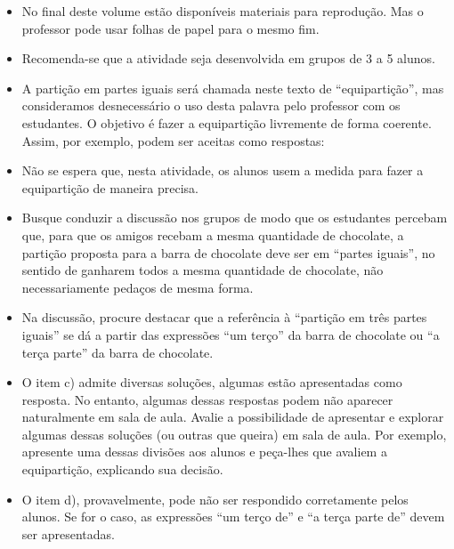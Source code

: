 \begin{multicols}{2}
\begin{orientacoes}
  \begin{itemize} %
  \item No final deste volume estão disponíveis materiais para reprodução. Mas o professor pode usar folhas de papel para o mesmo fim.
  \item Recomenda-se que a atividade seja desenvolvida em grupos de 3 a 5 alunos.
  \item A partição em partes iguais será chamada neste texto de ``equipartição'', mas consideramos desnecessário o uso desta palavra pelo professor com os estudantes. O objetivo é fazer a equipartição livremente de forma coerente. Assim, por exemplo, podem ser aceitas como respostas:
    \begin{center}
    \end{center}
  \item  Não se espera que, nesta atividade, os alunos usem a medida para fazer a equipartição de maneira precisa.
    \item Busque conduzir a discussão nos grupos de modo que os estudantes percebam que, para que os amigos recebam a mesma quantidade de chocolate, a partição proposta para a barra de chocolate deve ser em ``partes iguais'', no sentido de ganharem todos a mesma quantidade de chocolate, não necessariamente pedaços de mesma forma.
    \item Na discussão, procure destacar que a referência à ``partição em três partes iguais'' se dá a partir das expressões ``um terço'' da barra de chocolate ou ``a terça parte'' da barra de chocolate.
    \item O item c) admite diversas soluções, algumas estão apresentadas como resposta. No entanto, algumas dessas respostas podem não aparecer naturalmente em sala de aula. Avalie a possibilidade de apresentar e explorar algumas dessas soluções (ou outras que queira) em sala de aula. Por exemplo, apresente uma dessas divisões aos alunos e peça-lhes que avaliem a equipartição, explicando sua decisão.
    \item O item d), provavelmente, pode não ser respondido corretamente pelos alunos. Se for o caso, as expressões ``um terço de'' e ``a terça parte de'' devem ser apresentadas.

\end{itemize}
\end{orientacoes}
\end{multicols}
